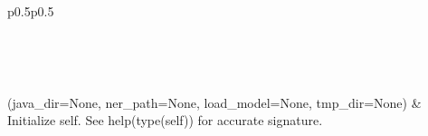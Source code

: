 \documentclass[letterpaper,10pt,english]{sphinxmanual}
\begin{document}
\begin{savenotes}\sphinxatlongtablestart\begin{longtable}[c]{p{0.5\linewidth}p{0.5\linewidth}}
\hline

\endfirsthead

%
{}\\
\hline

\endhead

\hline
{}\\
\endfoot

\endlastfoot

{\hyperref[\detokenize{autoapi/pine/pipelines/corenlp_NER_pipeline/index:pine.pipelines.corenlp_NER_pipeline.corenlp_NER}]{}}(java\_dir=None, ner\_path=None, load\_model=None, tmp\_dir=None)
&
Initialize self.  See help(type(self)) for accurate signature.
\\
\hline
\end{longtable}\sphinxatlongtableend\end{savenotes}

\begin{fulllineitems}
\label{\detokenize{autoapi/pine/pipelines/corenlp_NER_pipeline/index:pine.pipelines.corenlp_NER_pipeline.config}}
\end{fulllineitems}


\begin{fulllineitems}
\label{\detokenize{autoapi/pine/pipelines/corenlp_NER_pipeline/index:pine.pipelines.corenlp_NER_pipeline.logger}}
\end{fulllineitems}

\end{document}
